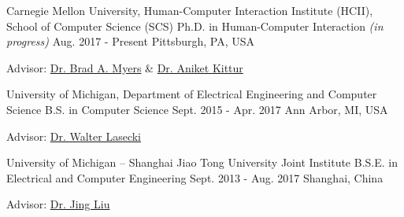 

\begin{cventries}

  \cventry
    {Carnegie Mellon University, Human-Computer Interaction Institute (HCII), School of Computer Science (SCS)} %
    {Ph.D. in Human-Computer Interaction \bodyfontlight\mdseries\textit{(in progress)}} %
    {Aug. 2017 - Present} %
    {Pittsburgh, PA, USA} %
    {
      \begin{cvitems} %
        \item {Advisor: \href{http://www.cs.cmu.edu/~bam/}{Dr. Brad A. Myers} \& \href{http://kittur.org/}{Dr. Aniket Kittur}}
      \end{cvitems}
    }
  
  \cventry
    {University of Michigan, Department of Electrical Engineering and Computer Science} %
    {B.S. in Computer Science} %
    {Sept. 2015 - Apr. 2017} %
    {Ann Arbor, MI, USA} %
    {
      \begin{cvitems} %
        \item {Advisor: \href{http://wslasecki.com/}{Dr. Walter Lasecki}}
      \end{cvitems}
    }
  
  \cventry
    {University of Michigan – Shanghai Jiao Tong University Joint Institute} %
    {B.S.E. in Electrical and Computer Engineering} %
    {Sept. 2013 - Aug. 2017} %
    {Shanghai, China} %
    {
      \begin{cvitems} %
        \item {Advisor: \href{http://umji.sjtu.edu.cn/faculty/jing-liu/}{Dr. Jing Liu}}
      \end{cvitems}
    }

\end{cventries}

